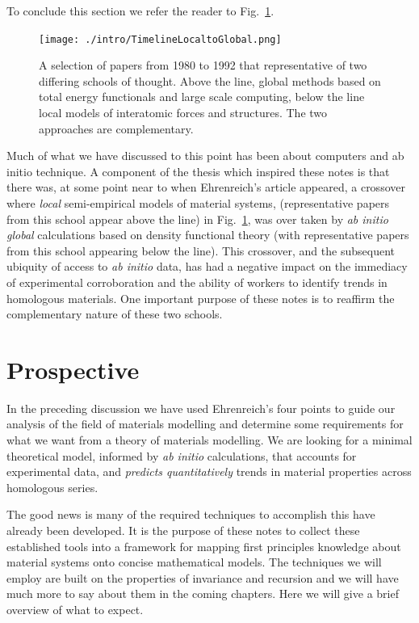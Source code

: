 To conclude this section we refer the reader to Fig.~\ref{fig:loctoglob}.
%
\begin{figure}
\texttt{[image: ./intro/TimelineLocaltoGlobal.png]}
\caption{A selection of papers from 1980 to 1992 that representative of two differing schools of thought. 
Above the line, global methods based on total energy functionals and large scale computing, below the 
        line local models of interatomic forces and structures. The two approaches are complementary.
        \label{fig:loctoglob}}
\end{figure}
%
Much of what we have discussed to this point has been about computers and ab initio technique.
A component of the thesis which inspired these notes is 
that there was, at some point near to when Ehrenreich's article appeared, 
a crossover where \textit{local} semi-empirical
models of material systems, (representative papers from this school appear 
above the line) in Fig.~\ref{fig:loctoglob}, was over taken by {\it ab initio} 
\textit{global} calculations based on density functional theory (with representative papers
from this school appearing below the line). 
This crossover, and the subsequent ubiquity of access to {\it ab initio} data, 
has had a negative impact on the immediacy of experimental corroboration 
and the ability of workers to identify trends in homologous materials.
One important purpose of these notes is to reaffirm the complementary nature of these
two schools.

\section{Prospective}
In the preceding discussion we have used 
Ehrenreich's four points to guide our analysis of the field of materials modelling
and determine some requirements for what we want from a theory of materials modelling.
We are looking for a minimal theoretical model, 
informed by {\it ab initio} calculations, that accounts for 
experimental data, and {\it predicts quantitatively} trends in material properties
across homologous series. 

The good news is many of the required techniques to accomplish this have
already been developed. It is the purpose of these notes to collect 
these established tools into 
a framework for mapping first principles knowledge about material systems 
onto concise mathematical models. The techniques we will employ are built
on the properties of invariance and recursion and we will have much more to 
say about them in the coming chapters. Here we will give a brief overview
of what to expect.

